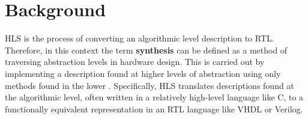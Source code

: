 \documentclass[11pt,journal,compsoc, onecolumn]{IEEEtran}
\begin{document}
\section{Background}\label{sec:background}

HLS is the process of converting an algorithmic level description to RTL. Therefore, in this context the term  \textbf{synthesis} can be defined as a method of traversing abstraction levels in hardware design. This is carried out by implementing a description found at higher levels of abstraction using only methods found in the lower \cite{churtl}. Specifically, HLS translates descriptions found at the algorithmic level, often written in a relatively high-level language like C, to a functionally equivalent representation in an RTL language like VHDL or Verilog.
\end{document}
